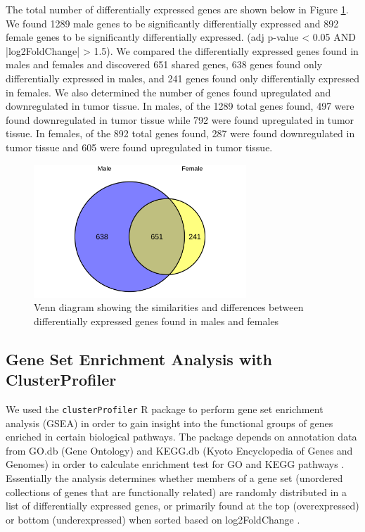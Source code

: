 \documentclass[10pt]{article}
\providecommand{\figref}[1]{Figure \ref{#1}}  %
\begin{document}
	The total number of differentially expressed genes are shown below in \figref{fig:6}. We found 1289 male genes to be significantly differentially expressed and 892 female genes to be significantly differentially expressed. (adj p-value < 0.05 AND |log2FoldChange| > 1.5). We compared the differentially expressed genes found in males and females and discovered 651 shared genes, 638 genes found only differentially expressed in males, and 241 genes found only differentially expressed in females. We also determined the number of genes found upregulated and downregulated in tumor tissue. In males, of the 1289 total genes found, 497 were found downregulated in tumor tissue while 792 were found upregulated in tumor tissue. In females, of the 892 total genes found, 287 were found downregulated in tumor tissue and 605 were found upregulated in tumor tissue.
	
	\begin{figure}[!h]
		\centering
		\includegraphics[width=8cm, height=5cm]{all_cancersvenndiagram_malede_vs_femalede_0.9.png}
		\caption{Venn diagram showing the similarities and differences between differentially expressed genes found in males and females}
		\label{fig:6}
	\end{figure}
	
	\subsection{Gene Set Enrichment Analysis with ClusterProfiler}
	
	We used the \texttt{clusterProfiler} R package to perform gene set enrichment analysis (GSEA) in order to gain insight into the functional groups of genes enriched in certain biological pathways. The package depends on annotation data from GO.db (Gene Ontology) and KEGG.db (Kyoto Encyclopedia of Genes and Genomes) in order to calculate enrichment test for GO and KEGG pathways \citep{yu2012clusterprofiler}. Essentially the analysis determines whether members of a gene set (unordered collections of genes that are functionally related) are randomly distributed in a list of differentially expressed genes, or primarily found at the top (overexpressed) or bottom (underexpressed) when sorted based on log2FoldChange \citep{yu2012clusterprofiler}.
	
\end{document}
